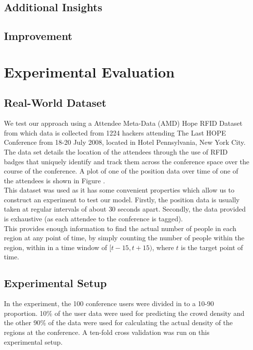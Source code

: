 \documentclass[letterpaper]{article}
\begin{document}
\subsection{Additional Insights}


\subsection{Improvement}



\section{Experimental Evaluation}

\subsection{Real-World Dataset}

We test our approach using a Attendee Meta-Data (AMD) Hope RFID Dataset from which data is collected from 1224 hackers attending The Last HOPE Conference from 18-20 July 2008, located in Hotel Pennsylvania, New York City.\\

The data set details the location of the attendees through the use of RFID badges that uniquely identify and track them across the conference space over the course of the conference. A plot of one of the position data over time of one of the attendees is shown in Figure .\\


This dataset was used as it has some convenient properties which allow us to construct an experiment to test our model. Firstly, the position data is usually taken at regular intervals of about $30$ seconds apart. Secondly, the data provided is exhaustive (as each attendee to the conference is tagged). \\

This provides enough information to find the actual number of people in each region at any point of time, by simply counting the number of people within the region, within in a time window of $[t-15,t+15)$, where $t$ is the target point of time.

\subsection{Experimental Setup}

In the experiment, the 100 conference users were divided in to a 10-90 proportion. 10\% of the user data were used for predicting the crowd density and the other 90\% of the data were used for calculating the actual density of the regions at the conference. A ten-fold cross validation was run on this experimental setup.
\end{document}
